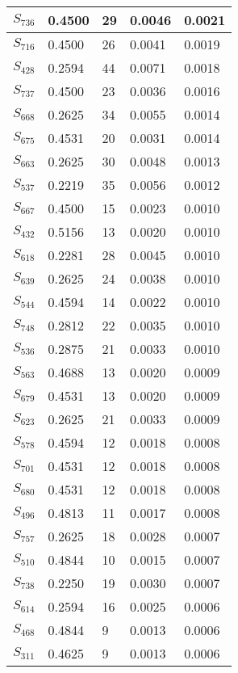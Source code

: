 \begin{xltabular}{\textwidth}{|X|X|X|X|X|}
 $S_{736}$ & 0.4500 & 29 & 0.0046 & 0.0021 \\ \hline
 $S_{716}$ & 0.4500 & 26 & 0.0041 & 0.0019 \\ \hline
 $S_{428}$ & 0.2594 & 44 & 0.0071 & 0.0018 \\ \hline
 $S_{737}$ & 0.4500 & 23 & 0.0036 & 0.0016 \\ \hline
 $S_{668}$ & 0.2625 & 34 & 0.0055 & 0.0014 \\ \hline
 $S_{675}$ & 0.4531 & 20 & 0.0031 & 0.0014 \\ \hline
 $S_{663}$ & 0.2625 & 30 & 0.0048 & 0.0013 \\ \hline
 $S_{537}$ & 0.2219 & 35 & 0.0056 & 0.0012 \\ \hline
 $S_{667}$ & 0.4500 & 15 & 0.0023 & 0.0010 \\ \hline
 $S_{432}$ & 0.5156 & 13 & 0.0020 & 0.0010 \\ \hline
 $S_{618}$ & 0.2281 & 28 & 0.0045 & 0.0010 \\ \hline
 $S_{639}$ & 0.2625 & 24 & 0.0038 & 0.0010 \\ \hline
 $S_{544}$ & 0.4594 & 14 & 0.0022 & 0.0010 \\ \hline
 $S_{748}$ & 0.2812 & 22 & 0.0035 & 0.0010 \\ \hline
 $S_{536}$ & 0.2875 & 21 & 0.0033 & 0.0010 \\ \hline
 $S_{563}$ & 0.4688 & 13 & 0.0020 & 0.0009 \\ \hline
 $S_{679}$ & 0.4531 & 13 & 0.0020 & 0.0009 \\ \hline
 $S_{623}$ & 0.2625 & 21 & 0.0033 & 0.0009 \\ \hline
 $S_{578}$ & 0.4594 & 12 & 0.0018 & 0.0008 \\ \hline
 $S_{701}$ & 0.4531 & 12 & 0.0018 & 0.0008 \\ \hline
 $S_{680}$ & 0.4531 & 12 & 0.0018 & 0.0008 \\ \hline
 $S_{496}$ & 0.4813 & 11 & 0.0017 & 0.0008 \\ \hline
 $S_{757}$ & 0.2625 & 18 & 0.0028 & 0.0007 \\ \hline
 $S_{510}$ & 0.4844 & 10 & 0.0015 & 0.0007 \\ \hline
 $S_{738}$ & 0.2250 & 19 & 0.0030 & 0.0007 \\ \hline
 $S_{614}$ & 0.2594 & 16 & 0.0025 & 0.0006 \\ \hline
 $S_{468}$ & 0.4844 & 9 & 0.0013 & 0.0006 \\ \hline
 $S_{311}$ & 0.4625 & 9 & 0.0013 & 0.0006 \\ \hline

\end{xltabular}

